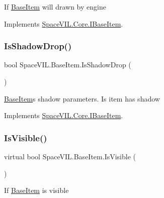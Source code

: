 If \mbox{\hyperlink{class_space_v_i_l_1_1_base_item}{Base\+Item}} will drawn by engine 



Implements \mbox{\hyperlink{interface_space_v_i_l_1_1_core_1_1_i_base_item}{Space\+V\+I\+L.\+Core.\+I\+Base\+Item}}.

\mbox{\label{class_space_v_i_l_1_1_base_item_aaed84b5d9c5b4b05ca46d72dcf370ef3}} 
\subsubsection{\texorpdfstring{Is\+Shadow\+Drop()}{IsShadowDrop()}}
{\footnotesize\ttfamily bool Space\+V\+I\+L.\+Base\+Item.\+Is\+Shadow\+Drop (\begin{DoxyParamCaption}{ }\end{DoxyParamCaption})}



\mbox{\hyperlink{class_space_v_i_l_1_1_base_item}{Base\+Item}}\textquotesingle{}s shadow parameters. Is item has shadow 



Implements \mbox{\hyperlink{interface_space_v_i_l_1_1_core_1_1_i_base_item}{Space\+V\+I\+L.\+Core.\+I\+Base\+Item}}.

\mbox{\label{class_space_v_i_l_1_1_base_item_a29b915d6e655b48a8b7505118441e961}} 
\subsubsection{\texorpdfstring{Is\+Visible()}{IsVisible()}}
{\footnotesize\ttfamily virtual bool Space\+V\+I\+L.\+Base\+Item.\+Is\+Visible (\begin{DoxyParamCaption}{ }\end{DoxyParamCaption})\hspace{0.3cm}{\ttfamily [virtual]}}



If \mbox{\hyperlink{class_space_v_i_l_1_1_base_item}{Base\+Item}} is visible 



